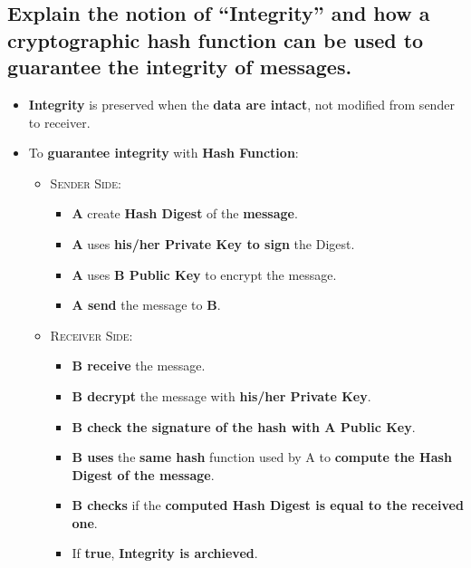 \documentclass[9pt, letterpaper]{article}
\begin{document}
\subsection{Explain the notion of “Integrity” and how a cryptographic hash function can be used to guarantee the integrity of messages.}
\begin{itemize}
	\item \textbf{Integrity} is preserved when the \textbf{data are intact}, not modified from sender to receiver.
	\item To \textbf{guarantee integrity} with \textbf{Hash Function}:
	\begin{itemize}
		\item \textsc{Sender Side}:
		\begin{itemize}
			\item \textbf{A} create \textbf{Hash Digest} of the \textbf{message}.
			\item \textbf{A} uses \textbf{his/her Private Key to sign} the Digest.
			\item \textbf{A} uses \textbf{B Public Key} to encrypt the message.
			\item \textbf{A send} the message to \textbf{B}.
		\end{itemize}
		\item \textsc{Receiver Side}:
		\begin{itemize}
			\item \textbf{B receive} the message.
			\item \textbf{B decrypt} the message with \textbf{his/her Private Key}.
			\item \textbf{B check the signature of the hash with A Public Key}.
			\item \textbf{B uses} the \textbf{same hash} function used by A to \textbf{compute the Hash Digest of the message}.
			\item \textbf{B checks} if the \textbf{computed Hash Digest is equal to the received one}.
			\item If \textbf{true}, \textbf{Integrity is archieved}.
		\end{itemize}
	\end{itemize}
\end{itemize}
\end{document}

